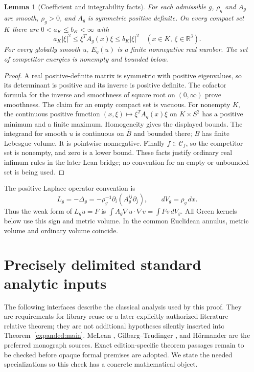 \documentclass[11pt]{article}
\newtheorem{lemma}[theorem]{Lemma}
\theoremstyle{definition}
\theoremstyle{remark}
\numberwithin{equation}{section}
\begin{document}
\begin{lemma}[Coefficient and integrability facts]\label{expanded:ellipticity}
For each admissible $g$, $\rho_g$ and $A_g$ are smooth, $\rho_g>0$, and
$A_g$ is symmetric positive definite. On every compact set $K$ there are
$0<a_K\leq b_K<\infty$ with
\[
 a_K|\xi|^2\leq \xi^TA_g(x)\xi\leq b_K|\xi|^2
 \quad(x\in K,\ \xi\in\mathbb R^3).
\]
For every globally smooth $u$, $E_g(u)$ is a finite nonnegative real
number. The set of competitor energies is nonempty and bounded below.
\end{lemma}
\begin{proof}
A real positive-definite matrix is symmetric with positive eigenvalues,
so its determinant is positive and its inverse is positive definite.
The cofactor formula for the inverse and smoothness of square root on
$(0,\infty)$ prove smoothness. The claim for an empty compact set is
vacuous. For nonempty $K$, the continuous positive function
$(x,\xi)\mapsto\xi^TA_g(x)\xi$ on $K\times S^2$ has a positive
minimum and a finite maximum. Homogeneity gives the displayed bounds.
The integrand for smooth $u$ is continuous on $\overline B$ and bounded
there; $B$ has finite Lebesgue volume. It is pointwise nonnegative.
Finally $f\in\mathcal C_f$, so the competitor set is nonempty, and
zero is a lower bound. These facts justify ordinary real infimum rules
in the later Lean bridge; no convention for an empty or unbounded set
is being used.
\end{proof}

The positive Laplace operator convention is
\begin{equation}\label{expanded:operator}
 L_g=-\Delta_g=-\rho_g^{-1}\partial_i(A_g^{ij}\partial_j),
 \qquad dV_g=\rho_g\,dx.
\end{equation}
Thus the weak form of $L_g u=F$ is
$\int A_g\nabla u\cdot\nabla v=\int Fv\,dV_g$.
All Green kernels below use this sign and metric volume. In the common
Euclidean annulus, metric volume and ordinary volume coincide.

\section{Precisely delimited standard analytic inputs}\label{expanded:interfaces}

The following interfaces describe the classical analysis used by this
proof. They are requirements for library reuse or a later explicitly
authorized literature-relative theorem; they are not additional hypotheses
silently inserted into Theorem~\ref{expanded:main}. McLean
\cite{McLean2000}, Gilbarg--Trudinger \cite{GT2001}, and H\"ormander
\cite{HormanderIII2007,HormanderIV2009} are the preferred monograph sources.
Exact edition-specific theorem passages remain to be checked before opaque
formal premises are adopted. We state the needed specializations so this
check has a concrete mathematical object.
\end{document}
